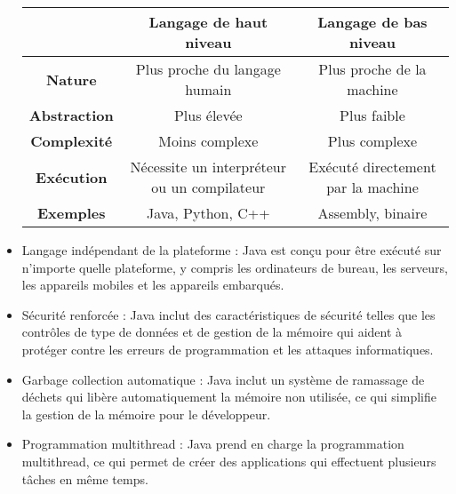 \begin{itemize}
\begin{tabular}{|c|c|c|}
\toprule
& \textbf{Langage de haut niveau} & \textbf{Langage de bas niveau} \\
\midrule
\textbf{Nature} & Plus proche du langage humain & Plus proche de la machine \\
\textbf{Abstraction} & Plus élevée & Plus faible \\
\textbf{Complexité} & Moins complexe & Plus complexe \\
\textbf{Exécution} & Nécessite un interpréteur ou un compilateur & Exécuté directement par la machine \\
\textbf{Exemples} & Java, Python, C++ & Assembly, binaire \\
\bottomrule
\end{tabular}


\item Langage indépendant de la plateforme : Java est conçu pour être exécuté sur n'importe quelle plateforme, y compris les ordinateurs de bureau, les serveurs, les appareils mobiles et les appareils embarqués.
\item Sécurité renforcée : Java inclut des caractéristiques de sécurité telles que les contrôles de type de données et de gestion de la mémoire qui aident à protéger contre les erreurs de programmation et les attaques informatiques.
\item Garbage collection automatique : Java inclut un système de ramassage de déchets qui libère automatiquement la mémoire non utilisée, ce qui simplifie la gestion de la mémoire pour le développeur.
\item Programmation multithread : Java prend en charge la programmation multithread, ce qui permet de créer des applications qui effectuent plusieurs tâches en même temps.
\end{itemize}
